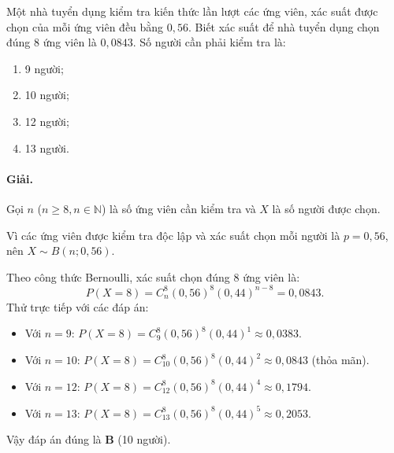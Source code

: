 \begin{vidu}[VD 5]
Một nhà tuyển dụng kiểm tra kiến thức lần lượt các ứng viên, xác suất được chọn của mỗi ứng viên đều bằng $0{,}56$. Biết xác suất để nhà tuyển dụng chọn đúng 8 ứng viên là $0{,}0843$. Số người cần phải kiểm tra là:
\begin{enumerate}[label=\Alph*.]
    \item 9 người;
    \item 10 người;
    \item 12 người;
    \item 13 người.
\end{enumerate}

\paragraph{Giải.}
Gọi $n$ ($n \ge 8, n \in \mathbb{N}$) là số ứng viên cần kiểm tra và $X$ là số người được chọn.

Vì các ứng viên được kiểm tra độc lập và xác suất chọn mỗi người là $p = 0{,}56$, nên $X \sim B(n; 0{,}56)$.

Theo công thức Bernoulli, xác suất chọn đúng 8 ứng viên là:
\[
P(X = 8) = C_n^8 (0{,}56)^8 (0{,}44)^{n - 8} = 0{,}0843.
\]
Thử trực tiếp với các đáp án:
\begin{itemize}
    \item Với $n = 9$: $P(X = 8) = C_9^8 (0{,}56)^8 (0{,}44)^1 \approx 0{,}0383$.
    \item Với $n = 10$: $P(X = 8) = C_{10}^8 (0{,}56)^8 (0{,}44)^2 \approx 0{,}0843$ (thỏa mãn).
    \item Với $n = 12$: $P(X = 8) = C_{12}^8 (0{,}56)^8 (0{,}44)^4 \approx 0{,}1794$.
    \item Với $n = 13$: $P(X = 8) = C_{13}^8 (0{,}56)^8 (0{,}44)^5 \approx 0{,}2053$.
\end{itemize}
Vậy đáp án đúng là \textbf{B} (10 người).
\end{vidu}

